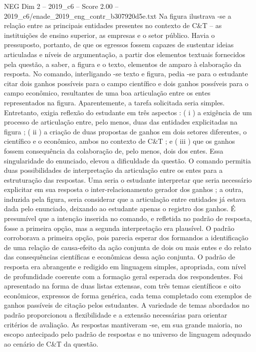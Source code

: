 \begin{textsample}{NEG Dim 2 – 2019\_c6 – Score 2.00 – 2019\_c6/enade\_2019\_eng\_contr\_b307920d5e.txt}
Na figura ilustrava -se a relação entre as principais entidades presentes no contexto de C\&T – as instituições de ensino superior, as empresas e o setor público.
Havia o pressuposto, portanto, de que os egressos fossem capazes de sustentar ideias articuladas e níveis de argumentação, a partir dos elementos textuais fornecidos pela questão, a saber, a figura e o texto, elementos de amparo à elaboração da resposta.
No comando, interligando -se texto e figura, pedia -se para o estudante citar dois ganhos possíveis para o campo científico e dois ganhos possíveis para o campo econômico, resultantes de uma boa articulação entre os entes representados na figura.
Aparentemente, a tarefa solicitada seria simples.
Entretanto, exigia reflexão do estudante em três aspectos : ( i ) a exigência de um processo de articulação entre, pelo menos, duas das entidades explicitadas na figura ; ( ii ) a criação de duas propostas de ganhos em dois setores diferentes, o científico e o econômico, ambos no contexto de C\&T ; e ( iii ) que os ganhos fossem consequência da colaboração de, pelo menos, dois dos entes.
Essa singularidade do enunciado, elevou a dificuldade da questão.
O comando permitia duas possibilidades de interpretação da articulação entre os entes para a estruturação das respostas.
Uma seria o estudante interpretar que seria necessário explicitar em sua resposta o inter-relacionamento gerador dos ganhos ; a outra, induzida pela figura, seria considerar que a articulação entre entidades já estava dada pelo enunciado, deixando ao estudante apenas o registro dos ganhos.
É presumível que a intenção inserida no comando, e refletida no padrão de resposta, fosse a primeira opção, mas a segunda interpretação era plausível.
O padrão corroborava a primeira opção, pois parecia esperar dos formandos a identificação de uma relação de causa-efeito da ação conjunta de dois ou mais entes e do relato das consequências científicas e econômicas dessa ação conjunta.
O padrão de resposta era abrangente e redigido em linguagem simples, apropriada, com nível de profundidade coerente com a formação geral esperada dos respondentes.
Foi apresentado na forma de duas listas extensas, com três temas científicos e oito econômicos, expressos de forma genérica, cada tema completado com exemplos de ganhos passíveis de citação pelos estudantes.
A variedade de temas abordados no padrão proporcionou a flexibilidade e a extensão necessárias para orientar critérios de avaliação.
As respostas mantiveram -se, em sua grande maioria, no escopo antecipado pelo padrão de respostas e no universo de linguagem adequado ao cenário de C\&T da questão.

\end{textsample}
